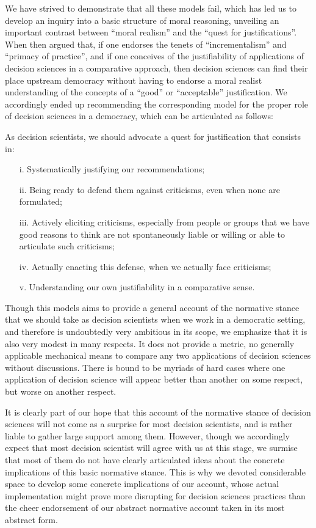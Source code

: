 \documentclass[preprint, french, english, 11pt, authoryear]{elsarticle}%
\begin{document}
We have strived to demonstrate that all these models fail, which has led us to develop an inquiry into a basic structure of moral reasoning, unveiling an important contrast between ``moral realism'' and the ``quest for justifications''. When then argued that, if one endorses the tenets of ``incrementalism'' and ``primacy of practice'', and if one conceives of the justifiability of applications of decision sciences in a comparative approach, then decision sciences can find their place upstream democracy without having to endorse a moral realist understanding of the concepts of a ``good'' or ``acceptable'' justification. We accordingly ended up recommending the corresponding model for the proper role of decision sciences in a democracy, which can be articulated as follows:

As decision scientists, we should advocate a quest for justification that consists in:
\begin{itemize}
\item[i.]	Systematically justifying our recommendations;
\item[ii.]	Being ready to defend them against criticisms, even when none are formulated;
\item[iii.]	Actively eliciting criticisms, especially from people or groups that we have good reasons to think are not spontaneously liable or willing or able to articulate such criticisms;
\item[iv.]	Actually enacting this defense, when we actually face criticisms;
\item[v.]	Understanding our own justifiability in a comparative sense.
\end{itemize}

Though this models aims to provide a general account of the normative stance that we should take as decision scientists when we work in a democratic setting, and therefore is undoubtedly very ambitious in its scope, we emphasize that it is also very modest in many respects. It does not provide a metric, no generally applicable mechanical means to compare any two applications of decision sciences without discussions. There is bound to be myriads of hard cases where one application of decision science will appear better than another on some respect, but worse on another respect.

It is clearly part of our hope that this account of the normative stance of decision sciences will not come as a surprise for most decision scientists, and is rather liable to gather large support among them. However, though we accordingly expect that most decision scientist will agree with us at this stage, we surmise that most of them do not have clearly articulated ideas about the concrete implications of this basic normative stance. This is why we devoted considerable space to develop some concrete implications of our account, whose actual implementation might prove more disrupting for decision sciences practices than the cheer endorsement of our abstract normative account taken in its most abstract form.
 
\end{document}
